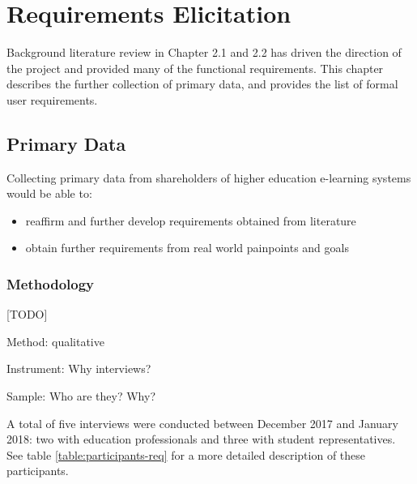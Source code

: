 \chapter{Requirements Elicitation}

Background literature review in Chapter 2.1 and 2.2 has driven the direction of the project and 
provided many of the functional requirements. This chapter describes the further collection of primary 
data, and provides the list of formal user requirements.

\section{Primary Data}
Collecting primary data from shareholders of higher education e-learning systems would be able to:
\begin{itemize}
    \item reaffirm and further develop requirements obtained from literature
    \item obtain further requirements from real world painpoints and goals
\end{itemize}

\subsection{Methodology}

[TODO]

Method: qualitative

Instrument: Why interviews?

Sample: Who are they? Why?

A total of five interviews were conducted between December 2017 and January 2018: 
two with education professionals and three with student representatives. See table 
\ref{table:participants-req} for a more detailed description of these participants.


